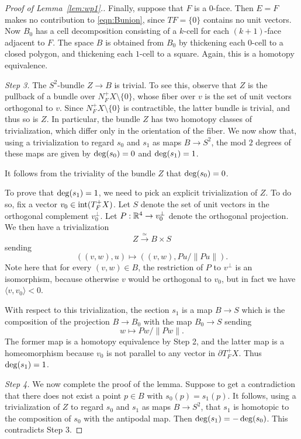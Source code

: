 \begin{proof}[Proof of Lemma~\ref{lem:wp1}.]
Finally, suppose that $F$ is a $0$-face. Then $E=F$ makes no contribution to \eqref{eqn:Bunion}, since $TF=\{0\}$ contains no unit vectors. Now $B_0$ has a cell decomposition consisting of a $k$-cell for each $(k+1)$-face adjacent to $F$. The space $B$ is obtained from $B_0$ by thickening each $0$-cell to a closed polygon, and thickening each $1$-cell to a square. Again, this is a homotopy equivalence.

{\em Step 3.\/} The $S^2$-bundle $Z\to B$ is trivial. To see this, observe that $Z$ is the pullback of a bundle over $N_F^+X\setminus\{0\}$, whose fiber over $v$ is the set of unit vectors orthogonal to $v$. Since $N_F^+X\setminus\{0\}$ is contractible, the latter bundle is trivial, and thus so is $Z$. In particular, the bundle $Z$ has two homotopy classes of trivialization, which differ only in the orientation of the fiber. We now show that, using a trivialization to regard $s_0$ and $s_1$ as maps $B\to S^2$, the mod $2$ degrees of these maps are given by $\operatorname{deg}(s_0)=0$ and $\operatorname{deg}(s_1)=1$.

It follows from the triviality of the bundle $Z$ that $\operatorname{deg}(s_0)=0$.

To prove that $\operatorname{deg}(s_1)=1$, we need to pick an explicit trivialization of $Z$. To do so, fix a vector $v_0\in\operatorname{int}(T_F^+X)$. Let $S$ denote the set of unit vectors in the orthogonal complement $v_0^\perp$. Let $P:{\mathbb R}^4\to v_0^\perp$ denote the orthogonal projection. We then have a trivialization
\[
Z \stackrel{\simeq}{\longrightarrow} B\times S
\]
sending
\[
((v,w),u) \longmapsto ((v,w),Pu/\|Pu\|).
\]
Note here that for every $(v,w)\in B$, the restriction of $P$ to $v^\perp$ is an isomorphism, because otherwise $v$ would be orthogonal to $v_0$, but in fact we have $\langle v,v_0\rangle < 0$.

With respect to this trivialization, the section $s_1$ is a map $B\to S$ which is the composition of the projection $B\to B_0$ with the map $B_0\to S$ sending
\[
w \longmapsto Pw/\|Pw\|.
\]
The former map is a homotopy equivalence by Step 2, and the latter map is a homeomorphism because $v_0$ is not parallel to any vector in $\partial T_F^+X$.  Thus $\operatorname{deg}(s_1)=1$.

{\em Step 4.\/} We now complete the proof of the lemma. Suppose to get a contradiction that there does not exist a point $p\in B$ with $s_0(p)=s_1(p)$. It follows, using a trivialization of $Z$ to regard $s_0$ and $s_1$ as maps $B\to S^2$, that $s_1$ is homotopic to the composition of $s_0$ with the antipodal map. Then $\operatorname{deg}(s_1)=-\operatorname{deg}(s_0)$. This contradicts Step 3.
\end{proof}

